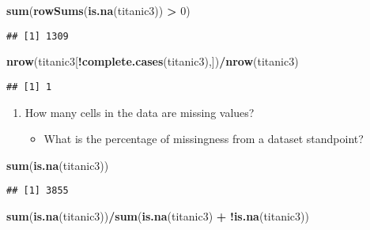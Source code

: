 \documentclass[]{article}
\newenvironment{Shaded}{\begin{snugshade}}{\end{snugshade}}
\newcommand{\KeywordTok}[1]{\textcolor[rgb]{0.13,0.29,0.53}{\textbf{#1}}}
\newcommand{\DecValTok}[1]{\textcolor[rgb]{0.00,0.00,0.81}{#1}}
\newcommand{\StringTok}[1]{\textcolor[rgb]{0.31,0.60,0.02}{#1}}
\newcommand{\OperatorTok}[1]{\textcolor[rgb]{0.81,0.36,0.00}{\textbf{#1}}}
\newcommand{\NormalTok}[1]{#1}
\providecommand{\tightlist}{%
  \setlength{\itemsep}{0pt}\setlength{\parskip}{0pt}}
\begin{document}
\begin{Shaded}
\begin{Highlighting}[]
\KeywordTok{sum}\NormalTok{(}\KeywordTok{rowSums}\NormalTok{(}\KeywordTok{is.na}\NormalTok{(titanic3)) }\OperatorTok{>}\StringTok{ }\DecValTok{0}\NormalTok{)}
\end{Highlighting}
\end{Shaded}

\begin{verbatim}
## [1] 1309
\end{verbatim}

\begin{Shaded}
\begin{Highlighting}[]
\KeywordTok{nrow}\NormalTok{(titanic3[}\OperatorTok{!}\KeywordTok{complete.cases}\NormalTok{(titanic3),])}\OperatorTok{/}\KeywordTok{nrow}\NormalTok{(titanic3)}
\end{Highlighting}
\end{Shaded}

\begin{verbatim}
## [1] 1
\end{verbatim}

\begin{enumerate}
\def\labelenumi{\arabic{enumi}.}
\setcounter{enumi}{2}
\tightlist
\item
  How many cells in the data are missing values?

  \begin{itemize}
  \tightlist
  \item
    What is the percentage of missingness from a dataset standpoint?
  \end{itemize}
\end{enumerate}

\begin{Shaded}
\begin{Highlighting}[]
\KeywordTok{sum}\NormalTok{(}\KeywordTok{is.na}\NormalTok{(titanic3))}
\end{Highlighting}
\end{Shaded}

\begin{verbatim}
## [1] 3855
\end{verbatim}

\begin{Shaded}
\begin{Highlighting}[]
\KeywordTok{sum}\NormalTok{(}\KeywordTok{is.na}\NormalTok{(titanic3))}\OperatorTok{/}\KeywordTok{sum}\NormalTok{(}\KeywordTok{is.na}\NormalTok{(titanic3) }\OperatorTok{+}\StringTok{ }\OperatorTok{!}\KeywordTok{is.na}\NormalTok{(titanic3))}
\end{Highlighting}
\end{Shaded}
\end{document}
